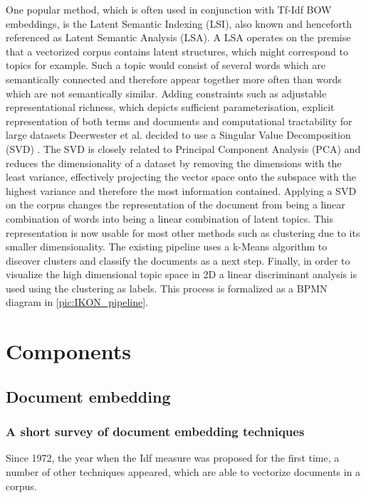 One popular method, which is often used in conjunction with Tf-Idf BOW embeddings, is the Latent Semantic Indexing (LSI), also known and henceforth referenced as Latent Semantic Analysis (LSA). A LSA operates on the premise that a vectorized corpus contains latent structures, which might correspond to topics for example. Such a topic would consist of several words which are semantically connected and therefore appear together more often than words which are not semantically similar. Adding constraints such as adjustable representational richness, which depicts sufficient parameterisation, explicit representation of both terms and documents and computational tractability for large datasets Deerwester et al. decided to use a Singular Value Decomposition (SVD) \cite{deerwesterIndexingLatentSemantic}. The SVD is closely related to Principal Component Analysis (PCA) and reduces the dimensionality of a dataset by removing the dimensions with the least variance, effectively projecting the vector space onto the subspace with the highest variance and therefore the most information contained. Applying a SVD on the corpus changes the representation of the document from being a linear combination of words into being a linear combination of latent topics. This representation is now usable for most other methods such as clustering due to its smaller dimensionality. The existing pipeline uses a k-Means algorithm to discover clusters and classify the documents as a next step. Finally, in order to visualize the high dimensional topic space in 2D a linear discriminant analysis is used using the clustering as labels. This process is formalized as a BPMN diagram in \autoref{pic:IKON_pipeline}.

\section{Components}



\subsection{Document embedding}

\subsubsection{A short survey of document embedding techniques}
Since 1972, the year when the Idf measure was proposed for the first time, \cite{robertsonUnderstandingInverseDocument2004} a number of other techniques appeared, which are able to vectorize documents in a corpus.

